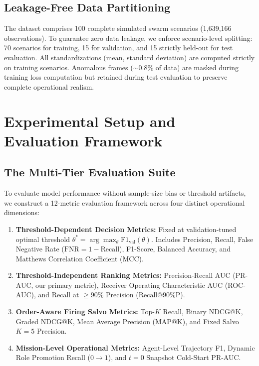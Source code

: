 \documentclass[9pt]{ieeeconf}
\begin{document}
\subsection{Leakage-Free Data Partitioning}
The dataset comprises 100 complete simulated swarm scenarios (1,639,166 observations). To guarantee zero data leakage, we enforce scenario-level splitting: 70 scenarios for training, 15 for validation, and 15 strictly held-out for test evaluation. All standardizations (mean, standard deviation) are computed strictly on training scenarios. Anomalous frames ($\sim 0.8\%$ of data) are masked during training loss computation but retained during test evaluation to preserve complete operational realism.

\section{Experimental Setup and Evaluation Framework}
\label{sec:experiments}

\subsection{The Multi-Tier Evaluation Suite}
To evaluate model performance without sample-size bias or threshold artifacts, we construct a 12-metric evaluation framework across four distinct operational dimensions:
\begin{enumerate}
    \item \textbf{Threshold-Dependent Decision Metrics:} Fixed at validation-tuned optimal threshold $\theta^* = \arg\max_\theta \text{F1}_{\text{val}}(\theta)$. Includes Precision, Recall, False Negative Rate ($\text{FNR} = 1 - \text{Recall}$), F1-Score, Balanced Accuracy, and Matthews Correlation Coefficient (MCC).
    \item \textbf{Threshold-Independent Ranking Metrics:} Precision-Recall AUC (PR-AUC, our primary metric), Receiver Operating Characteristic AUC (ROC-AUC), and Recall at $\ge 90\%$ Precision ($\text{Recall@90\%P}$).
    \item \textbf{Order-Aware Firing Salvo Metrics:} Top-$K$ Recall, Binary NDCG@K, Graded NDCG@K, Mean Average Precision (MAP@K), and Fixed Salvo $K=5$ Precision.
    \item \textbf{Mission-Level Operational Metrics:} Agent-Level Trajectory F1, Dynamic Role Promotion Recall ($0 \to 1$), and $t=0$ Snapshot Cold-Start PR-AUC.
\end{enumerate}
\end{document}
